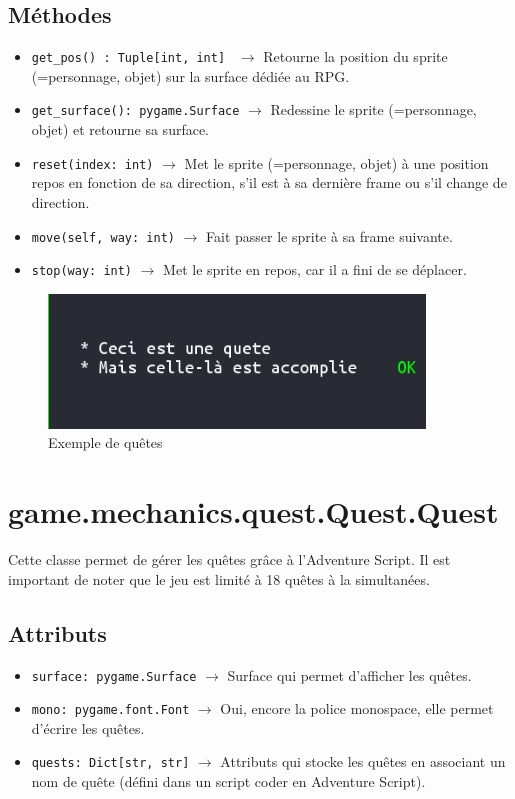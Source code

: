 \documentclass{report}
\begin{document}
\subsection*{Méthodes}
\begin{itemize}
  \item \texttt{get_pos() : Tuple[int, int] }		$\rightarrow$ Retourne la position du sprite (=personnage, objet) sur la surface dédiée au RPG.
  \item \texttt{get_surface(): pygame.Surface}		$\rightarrow$ Redessine le sprite (=personnage, objet) et retourne sa surface.
  \item \texttt{reset(index: int)}		$\rightarrow$ Met le sprite (=personnage, objet) à une position repos en fonction de sa direction, s’il est à sa dernière frame ou s’il change de direction.
  \item \texttt{move(self, way: int)}		$\rightarrow$ Fait passer le sprite à sa frame suivante.
  \item \texttt{stop(way: int)}		$\rightarrow$ Met le sprite en repos, car il a fini de se déplacer.
\end{itemize}
\newpage
\begin{figure}[hb!]
  \centering
  \includegraphics[width=10cm]{img/image4}
  \caption{Exemple de quêtes}
  \label{fig:spritesheet}
\end{figure}
\section{game.mechanics.quest.Quest.Quest}
Cette classe permet de gérer les quêtes grâce à l'Adventure Script. Il est important de noter que le jeu est limité à 18 quêtes à la simultanées.

\subsection*{Attributs}
\begin{itemize}
  \item \texttt{surface: pygame.Surface} $\rightarrow$ Surface qui permet d'afficher les quêtes.
  \item \texttt{mono: pygame.font.Font} $\rightarrow$ Oui, encore la police monospace, elle permet d'écrire les quêtes.
  \item \texttt{quests: Dict[str, str]} $\rightarrow$ Attributs qui stocke les quêtes en associant un nom de quête (défini dans un script coder en Adventure Script).
\end{itemize}
\end{document}
